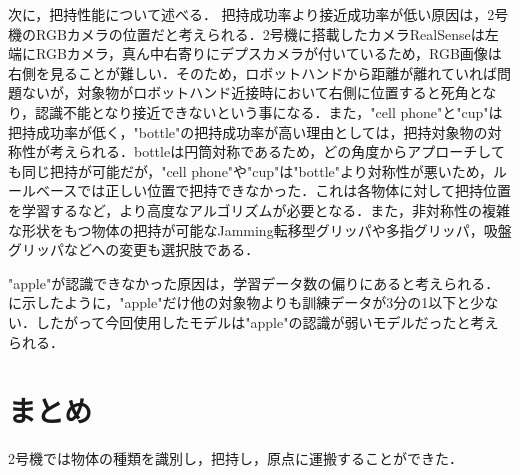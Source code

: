 次に，把持性能について述べる．
把持成功率より接近成功率が低い原因は，2号機のRGBカメラの位置だと考えられる．2号機に搭載したカメラRealSenseは左端にRGBカメラ，真ん中右寄りにデプスカメラが付いているため，RGB画像は右側を見ることが難しい．そのため，ロボットハンドから距離が離れていれば問題ないが，対象物がロボットハンド近接時において右側に位置すると死角となり，認識不能となり接近できないという事になる．また，"cell phone"と"cup"は把持成功率が低く，"bottle"の把持成功率が高い理由としては，把持対象物の対称性が考えられる．bottleは円筒対称であるため，どの角度からアプローチしても同じ把持が可能だが，"cell phone"や"cup"は"bottle"より対称性が悪いため，ルールベースでは正しい位置で把持できなかった．これは各物体に対して把持位置を学習するなど，より高度なアルゴリズムが必要となる．また，非対称性の複雑な形状をもつ物体の把持が可能なJamming転移型グリッパ\cite{jamminggripper}や多指グリッパ，吸盤グリッパ\cite{vacuumgripper}などへの変更も選択肢である．

"apple"が認識できなかった原因は，学習データ数の偏りにあると考えられる．に示したように，"apple"だけ他の対象物よりも訓練データが3分の1以下と少ない．したがって今回使用したモデルは"apple"の認識が弱いモデルだったと考えられる．

\section{まとめ}
2号機では物体の種類を識別し，把持し，原点に運搬することができた．

